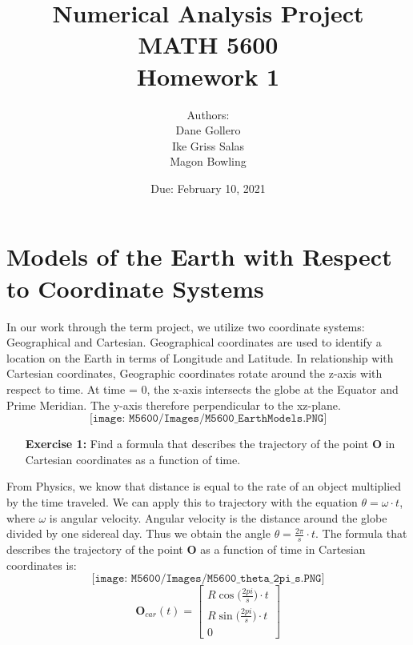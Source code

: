 \documentclass[11pt]{article}
\theoremstyle{definition}
\newcommand{\1}[1]{\mathbf{1} \left \{ #1 \right \}}
\begin{document}
\title{Numerical Analysis Project \\ MATH 5600 \\ Homework 1}
\date{Due: February 10, 2021}
\author{Authors: \\ Dane Gollero \\ Ike Griss Salas \\ Magon Bowling}

\maketitle

\section*{\textbf{Models of the Earth with Respect to Coordinate Systems}}
In our work through the term project, we utilize two coordinate systems: Geographical and Cartesian.  Geographical coordinates are used to identify a location on the Earth in terms of Longitude and Latitude.  In relationship with Cartesian coordinates, Geographic coordinates rotate around the z-axis with respect to time.  At time = 0, the x-axis intersects the globe at the Equator and Prime Meridian.  The y-axis therefore perpendicular to the xz-plane.
\[\texttt{[image: M5600/Images/M5600\_EarthModels.PNG]}\]

\begin{itemize}
\item[{\textbf{Exercise 1:}}] Find a formula that describes the trajectory of the point \textbf{O} in Cartesian coordinates as a function of time.
\end{itemize}
From Physics, we know that distance is equal to the rate of an object multiplied by the time traveled.  We can apply this to trajectory with the equation $\theta = \omega \cdot t$, where $\omega$ is angular velocity.  Angular velocity is the distance around the globe divided by one sidereal day.  Thus we obtain the angle $\theta = \frac{2\pi}{s} \cdot t$.  The formula that describes the trajectory of the point \textbf{O} as a function of time in Cartesian coordinates is: \\
\[\texttt{[image: M5600/Images/M5600\_theta\_2pi\_s.PNG]}\]
\[\textbf{O}_{car}(t) =
\begin{bmatrix}
R \cos{\big(\frac{2pi}{s}\big) \cdot t} \\
R \sin{\big(\frac{2pi}{s}\big) \cdot t} \\
0 \end{bmatrix} \]
\end{document}
